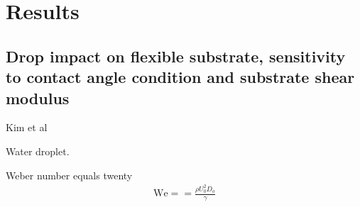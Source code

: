 \documentclass[]{article}
\begin{document}

\section{Results}

\subsection{Drop impact on flexible substrate, sensitivity to contact
  angle condition and substrate shear modulus}

Kim et al\cite{kim2018dynamics}

Water droplet.

Weber number equals twenty
\begin{eqnarray}
\mbox{We}==\frac{\rho U_{0}^{2}D_{o}}{\gamma}
\end{eqnarray}
\end{document}
